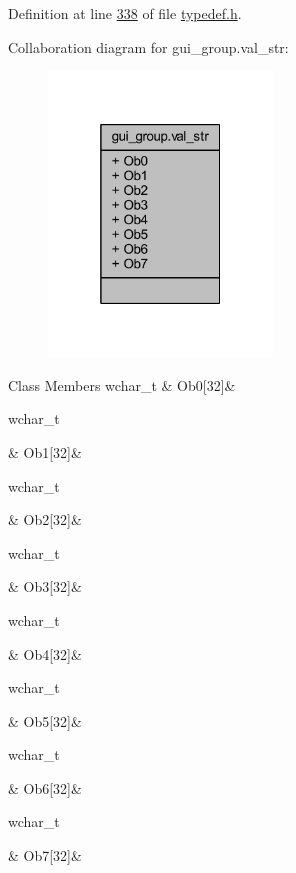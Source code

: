 Definition at line \hyperlink{a00001_source_l00338}{338} of file \hyperlink{a00001_source}{typedef.\+h}.



Collaboration diagram for gui\+\_\+group.\+val\+\_\+str\+:
\nopagebreak
\begin{figure}[H]
\begin{center}
\leavevmode
\includegraphics[width=169pt]{da/d53/a00265}
\end{center}
\end{figure}
\begin{DoxyFields}{Class Members}
\hypertarget{a00001_a729e79b7bd4f2f04e970e13467fdfa72}{wchar\+\_\+t}\label{a00001_a729e79b7bd4f2f04e970e13467fdfa72}
&
Ob0\mbox{[}32\mbox{]}&
\\
\hline

\hypertarget{a00001_a0a2bf783bbd7b9da21fc586036261ffa}{wchar\+\_\+t}\label{a00001_a0a2bf783bbd7b9da21fc586036261ffa}
&
Ob1\mbox{[}32\mbox{]}&
\\
\hline

\hypertarget{a00001_a6b4e47d5a974bbc03a72aa8d6b8a2d8c}{wchar\+\_\+t}\label{a00001_a6b4e47d5a974bbc03a72aa8d6b8a2d8c}
&
Ob2\mbox{[}32\mbox{]}&
\\
\hline

\hypertarget{a00001_aba90afbfca46ef35546b3695f5e26818}{wchar\+\_\+t}\label{a00001_aba90afbfca46ef35546b3695f5e26818}
&
Ob3\mbox{[}32\mbox{]}&
\\
\hline

\hypertarget{a00001_a5fd626edb190ed84facf9487b1c97d03}{wchar\+\_\+t}\label{a00001_a5fd626edb190ed84facf9487b1c97d03}
&
Ob4\mbox{[}32\mbox{]}&
\\
\hline

\hypertarget{a00001_a3223deba6662cd3cad287cc2f3351a04}{wchar\+\_\+t}\label{a00001_a3223deba6662cd3cad287cc2f3351a04}
&
Ob5\mbox{[}32\mbox{]}&
\\
\hline

\hypertarget{a00001_aa0f760ad2a5f44e338c973d817b6a944}{wchar\+\_\+t}\label{a00001_aa0f760ad2a5f44e338c973d817b6a944}
&
Ob6\mbox{[}32\mbox{]}&
\\
\hline

\hypertarget{a00001_a3fe84399563785bcb09713c3c8ee4b82}{wchar\+\_\+t}\label{a00001_a3fe84399563785bcb09713c3c8ee4b82}
&
Ob7\mbox{[}32\mbox{]}&
\\
\hline

\end{DoxyFields}
\label{de/d76/a00134}
\hypertarget{a00001_de/d76/a00134}{}
